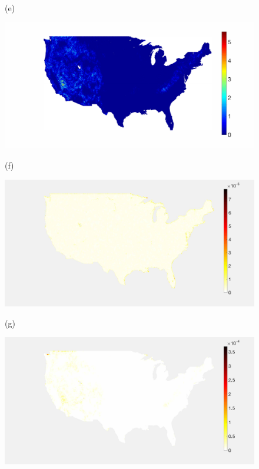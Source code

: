\documentclass[journal, 10pt]{IEEEtran}
\begin{document}
\begin{figure}[tb]
\begin{minipage}[m]{0.24\linewidth}
\centerline{\small{(e)}}
\end{minipage}
\begin{minipage}[m]{0.24\linewidth}
\centerline{\includegraphics[width=1\linewidth]{fig_temp_band2_coeffs}}
\centerline{\small{(f)}}
\end{minipage} %
\begin{minipage}[m]{0.24\linewidth}
\centerline{\includegraphics[width=.95\linewidth]{fig_temp_sampling2}}
\centerline{\small{(g)}}
\end{minipage}
\begin{minipage}[m]{0.24\linewidth}
\centerline{\includegraphics[width=.95\linewidth]{fig_temp_sampling2_adapted}}

\end{minipage}
\end{figure}
\end{document}
